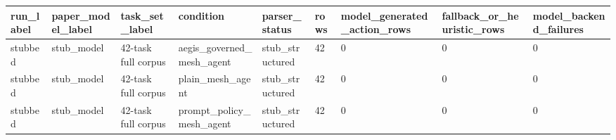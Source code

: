 \begin{tabular}{lllllllll}
 \hline
run\_label & paper\_model\_label & task\_set\_label & condition & parser\_status & rows & model\_generated\_action\_rows & fallback\_or\_heuristic\_rows & model\_backend\_failures \\
 \hline
stubbed & stub\_model & 42-task full corpus & aegis\_governed\_mesh\_agent & stub\_structured & 42 & 0 & 0 & 0 \\
stubbed & stub\_model & 42-task full corpus & plain\_mesh\_agent & stub\_structured & 42 & 0 & 0 & 0 \\
stubbed & stub\_model & 42-task full corpus & prompt\_policy\_mesh\_agent & stub\_structured & 42 & 0 & 0 & 0 \\
 \hline
\end{tabular}
